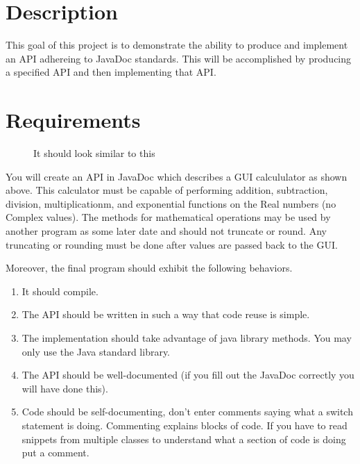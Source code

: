 \documentclass[]{simple}
\begin{document}
\section{Description}
This goal of this project is to demonstrate the ability to produce and implement an API adhereing to JavaDoc standards.
This will be accomplished by producing a specified API and then implementing that API.
\section{Requirements}
\begin{figure}[h!]
\centering
\caption{It should look similar to this}
\end{figure}
You will create an API in JavaDoc which describes a GUI calcululator as shown above.
This calculator must be capable of performing addition, subtraction, division, multiplicationm, and exponential functions on the Real numbers (no Complex values).
The methods for mathematical operations may be used by another program as some later date and should not truncate or round.
Any truncating or rounding must be done after values are passed back to the GUI.

Moreover, the final program should exhibit the following behaviors.
\begin{enumerate}
\item It should compile.
\item The API should be written in such a way that code reuse is simple.
\item The implementation should take advantage of java library methods. You may only use the Java standard library.
\item The API should be well-documented (if you fill out the JavaDoc correctly you will have done this).
\item Code should be self-documenting, don't enter comments saying what a switch statement is doing. Commenting explains blocks of code.
If you have to read snippets from multiple classes to understand what a section of code is doing put a comment.
\end{enumerate}
\end{document}

